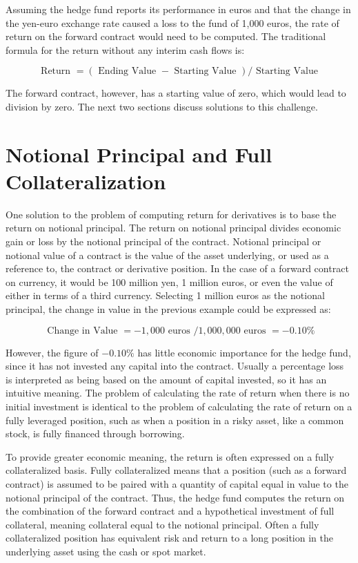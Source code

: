 \documentclass[11pt]{article}
\begin{document}
Assuming the hedge fund reports its performance in euros and that the change in the yen-euro exchange rate caused a loss to the fund of 1,000 euros, the rate of return on the forward contract would need to be computed. The traditional formula for the return without any interim cash flows is:

$$
\text { Return }=(\text { Ending Value }- \text { Starting Value }) / \text { Starting Value }
$$

The forward contract, however, has a starting value of zero, which would lead to division by zero. The next two sections discuss solutions to this challenge.

\section*{Notional Principal and Full Collateralization}
One solution to the problem of computing return for derivatives is to base the return on notional principal. The return on notional principal divides economic gain or loss by the notional principal of the contract. Notional principal or notional value of a contract is the value of the asset underlying, or used as a reference to, the contract or derivative position. In the case of a forward contract on currency, it would be 100 million yen, 1 million euros, or even the value of either in terms of a third currency. Selecting 1 million euros as the notional principal, the change in value in the previous example could be expressed as:

$$
\text { Change in Value }=-1,000 \text { euros } / 1,000,000 \text { euros }=-0.10 \%
$$

However, the figure of $-0.10 \%$ has little economic importance for the hedge fund, since it has not invested any capital into the contract. Usually a percentage loss is interpreted as being based on the amount of capital invested, so it has an intuitive meaning. The problem of calculating the rate of return when there is no initial investment is identical to the problem of calculating the rate of return on a fully leveraged position, such as when a position in a risky asset, like a common stock, is fully financed through borrowing.

To provide greater economic meaning, the return is often expressed on a fully collateralized basis. Fully collateralized means that a position (such as a forward contract) is assumed to be paired with a quantity of capital equal in value to the notional principal of the contract. Thus, the hedge fund computes the return on the combination of the forward contract and a hypothetical investment of full collateral, meaning collateral equal to the notional principal. Often a fully collateralized position has equivalent risk and return to a long position in the underlying asset using the cash or spot market.
\end{document}
